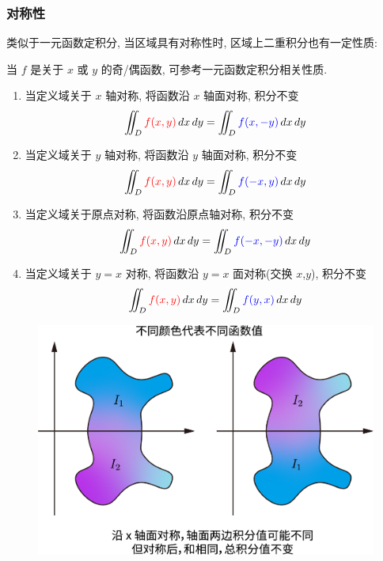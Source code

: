 \documentclass[UTF8]{ctexart}
\begin{document}
\subsubsection{对称性}
类似于一元函数定积分, 当区域具有对称性时, 区域上二重积分也有一定性质:

当 $ f $ 是关于 $ x $ 或 $ y $ 的奇/偶函数, 可参考一元函数定积分相关性质.

\begin{enumerate}
    \item 当定义域关于 $ x $ 轴对称, 将函数沿 $ x $ 轴面对称, 积分不变 \[ \iint_D {\color{red} f(x, y)} \,dx\,dy = \iint_D {\color{blue} f(x, -y)} \,dx\,dy \]
    \item 当定义域关于 $ y $ 轴对称, 将函数沿 $ y $ 轴面对称, 积分不变 \[ \iint_D {\color{red} f(x, y)} \,dx\,dy = \iint_D {\color{blue} f(-x, y)} \,dx\,dy \]
    \item 当定义域关于原点对称, 将函数沿原点轴对称, 积分不变 \[ \iint_D {\color{red} f(x, y)} \,dx\,dy = \iint_D {\color{blue} f(-x, -y)} \,dx\,dy \]
    \item 当定义域关于 $ y = x $ 对称, 将函数沿 $ y = x $ 面对称(交换 $x$,$y$), 积分不变 \[ \iint_D {\color{red} f(x, y)} \,dx\,dy = \iint_D {\color{blue} f(y, x)} \,dx\,dy \]
\end{enumerate}

\begin{figure}[H]
    \centering
    \includegraphics[width = 0.65\linewidth]{symmetry2}
\end{figure}
\end{document}
